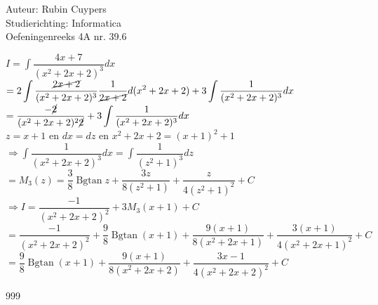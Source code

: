 \documentclass[a4paper]{article}
\begin{document}
  
\noindent \large Auteur: Rubin Cuypers \\
\noindent \large Studierichting: Informatica\\
\noindent \large Oefeningenreeks 4A nr. 39.6\\

\medskip

\normalsize

$ I=\displaystyle\int \dfrac{4x+7}{(x^2+2x+2)^3} dx$\\

$ = 2\displaystyle\int \dfrac{\cancel{2x+2}}{(x^2+2x+2)^3} \dfrac{1}{\cancel{2x+2}} d(x^2+2x+2) + 3\displaystyle\int \dfrac{1}{(x^2+2x+2)^3} dx$\\ 

$= \dfrac{-\cancel{2}}{(x^2+2x+2)^2 \cancel{2}}+ 3 \displaystyle\int \dfrac{1}{(x^2+2x+2)^3} dx$\\

$ z=x+1 $ en $ dx=dz$ en $x^2+2x+2=(x+1)^2 +1$\\

$\Rightarrow   \displaystyle\int \dfrac{1}{(x^2+2x+2)^3} dx = \displaystyle\int \dfrac{1}{(z^2+1)^3} dz$\\

$= M_3(z)=\dfrac{3}{8}  \operatorname{Bgtan} z+ \dfrac{3z}{8(z^2+1)}+\dfrac{z}{4(z^2+1)^2}+C$\\

$\Rightarrow I=\dfrac{-1}{(x^2+2x+2)^2}+3 M_3(x+1) +C$\\

$=\dfrac{-1}{(x^2+2x+2)^2}+\dfrac{9}{8}  \operatorname{Bgtan} (x+1)+ \dfrac{9(x+1)}{8(x^2+2x+1)}+\dfrac{3(x+1)}{4(x^2+2x+1)^2}+C$\\

$=\dfrac{9}{8}  \operatorname{Bgtan} (x+1) + \dfrac{9(x+1)}{8(x^2+2x+2)} +\dfrac{3x-1}{4(x^2+2x+2)^2}+C$\\


\begin{thebibliography}{999}
\end{thebibliography}
\end{document}
